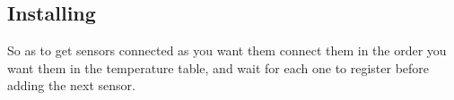 

\subsection {Installing}
So as to get sensors connected as you want them connect them in the order you want 
them in the temperature table, and wait for each one to register before adding the next sensor.
